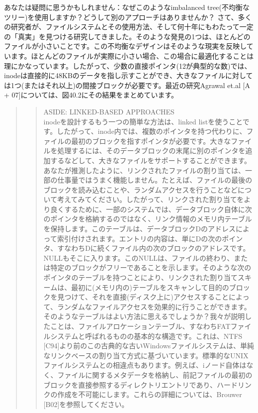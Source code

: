 あなたは疑問に思うかもしれません：なぜこのようなimbalanced
tree(不均衡なツリー)を使用しますか？どうして別のアプローチはありませんか？
さて、多くの研究者が、ファイルシステムとその使用方法、そして何十年にもわたって一定の「真実」を見つける研究してきました。そのような発見の1つは、ほとんどのファイルが小さいことです。この不均衡なデザインはそのような現実を反映しています。ほとんどのファイルが実際に小さい場合、この場合に最適化することは理にかなっています。したがって、少数の直接ポインタ(12が典型的な数)では、inodeは直接的に48KBのデータを指し示すことができ、大きなファイルに対しては1つ(またはそれ以上)の間接ブロックが必要です。最近の研究Agrawal
et.al {[}A + 07{]}については、図40.2にその結果をまとめています。

\begin{quote}
\begin{quote}
ASIDE: LINKED-BASED APPROACHES\\
inodeを設計するもう一つの簡単な方法は、linked
listを使うことです。したがって、inode内では、複数のポインタを持つ代わりに、ファイルの最初のブロックを指すポインタが必要です。大きなファイルを処理するには、そのデータブロックの末尾に別のポインタを追加するなどして、大きなファイルをサポートすることができます。\\
あなたが推測したように、リンクされたファイルの割り当ては、一部の仕事量ではうまく機能しません。たとえば、ファイルの最後のブロックを読み込むことや、ランダムアクセスを行うことなどについて考えてみてください。したがって、リンクされた割り当てをより良くするために、一部のシステムでは、データブロック自体に次のポインタを格納するのではなく、リンク情報のメモリ内テーブルを保持します。このテーブルは、データブロックDのアドレスによって索引付けされます。エントリの内容は、単にDの次のポインタ、すなわちDに続くファイル内の次のブロックのアドレスです。NULLもそこに入ります。このNULLは、ファイルの終わり、または特定のブロックがフリーであることを示します。そのような次のポインタのテーブルを持つことにより、リンクされた割り当てスキームは、最初に(メモリ内の)テーブルをスキャンして目的のブロックを見つけて、それを直接(ディスク上に)アクセスすることによって、ランダムなファイルアクセスを効果的に行うことができます。\\
そのようなテーブルはよい方法に思えるでしょうか？我々が説明したことは、ファイルアロケーションテーブル、すなわちFATファイルシステムと呼ばれるものの基本的な構造です。これは、NTFS
{[}C94{]}より前のこの古典的な古いWindowsファイルシステムは、単純なリンクベースの割り当て方式に基づいています。標準的なUNIXファイルシステムとの相違点もあります。例えば、iノード自体はなく、ファイルに関するメタデータを格納し、前記ファイルの最初のブロックを直接参照するディレクトリエントリであり、ハードリンクの作成を不可能にします。これらの詳細については、Brouwer
{[}B02{]}を参照してください。
\end{quote}
\end{quote}


